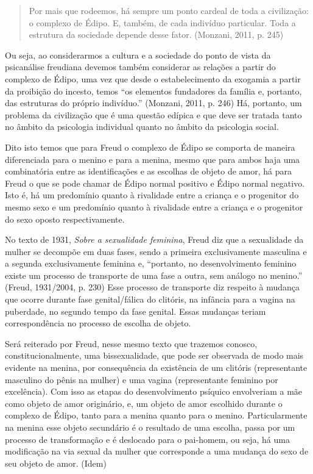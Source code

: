 \begin{quote}
Por mais que rodeemos, há sempre um ponto cardeal de toda a civilização:
o complexo de Édipo. E, também, de cada indivíduo particular. Toda a
estrutura da sociedade depende desse fator. (Monzani, 2011, p. 245)
\end{quote}

Ou seja, ao considerarmos a cultura e a sociedade do ponto de vista da
psicanálise freudiana devemos também considerar as relações a partir do
complexo de Édipo, uma vez que desde o estabelecimento da exogamia a
partir da proibição do incesto, temos ``os elementos fundadores da
família e, portanto, das estruturas do próprio indivíduo.'' (Monzani,
2011, p. 246) Há, portanto, um problema da civilização que é uma questão
edípica e que deve ser tratada tanto no âmbito da psicologia individual
quanto no âmbito da psicologia social.

Dito isto temos que para Freud o complexo de Édipo se comporta de
maneira diferenciada para o menino e para a menina, mesmo que para ambos
haja uma combinatória entre as identificações e as escolhas de objeto de
amor, há para Freud o que se pode chamar de Édipo normal positivo e
Édipo normal negativo. Isto é, há um predomínio quanto à rivalidade
entre a criança e o progenitor do mesmo sexo e um predomínio quanto à
rivalidade entre a criança e o progenitor do sexo oposto
respectivamente.

No texto de 1931, \emph{Sobre a sexualidade feminina}, Freud diz que a
sexualidade da mulher se decompõe em duas fases, sendo a primeira
exclusivamente masculina e a segunda exclusivamente feminina e,
``portanto, no desenvolvimento feminino existe um processo de transporte
de uma fase a outra, sem análogo no menino.'' (Freud, 1931/2004, p. 230)
Esse processo de transporte diz respeito à mudança que ocorre durante
fase genital/fálica do clitóris, na infância para a vagina na puberdade,
no segundo tempo da fase genital. Essas mudanças teriam correspondência
no processo de escolha de objeto.

Será reiterado por Freud, nesse mesmo texto que trazemos conosco,
constitucionalmente, uma bissexualidade, que pode ser observada de modo
mais evidente na menina, por consequência da existência de um clitóris
(representante masculino do pênis na mulher) e uma vagina (representante
feminino por excelência). Com isso as etapas do desenvolvimento psíquico
envolveriam a mãe como objeto de amor originário, e, um objeto de amor
escolhido durante o complexo de Édipo, tanto para a menina quanto para o
menino. Particularmente na menina esse objeto secundário é o resultado
de uma escolha, passa por um processo de transformação e é deslocado
para o pai-homem, ou seja, há uma modificação na via sexual da mulher
que corresponde a uma mudança do sexo de seu objeto de amor. (Idem)

